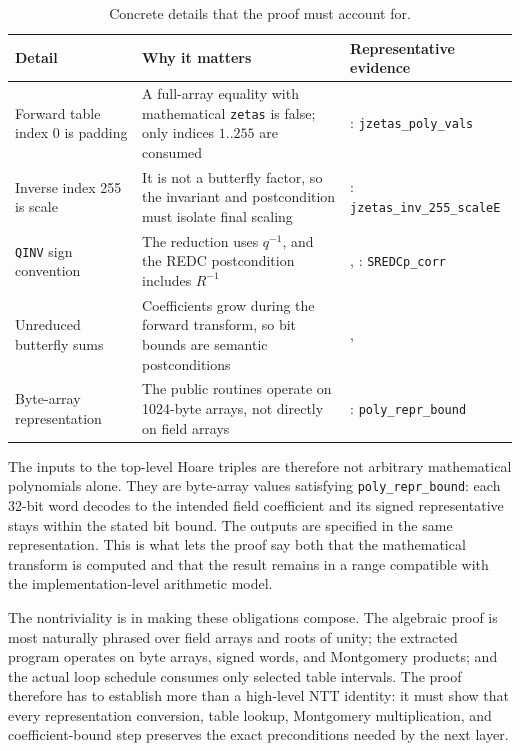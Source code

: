 \documentclass[10pt,twocolumn]{article}
\begin{document}
\begin{table}[t]
\centering
\scriptsize
\setlength{\tabcolsep}{3pt}
\begin{tabular}{P{0.26\columnwidth}P{0.36\columnwidth}P{0.28\columnwidth}}
\toprule
Detail & Why it matters & Representative evidence \\
\midrule
Forward table index 0 is padding & A full-array equality with mathematical
\texttt{zetas} is false; only indices \(1..255\) are consumed
& : \texttt{jzetas\_poly\_vals} \\
Inverse index 255 is scale & It is not a butterfly factor, so the invariant and
postcondition must isolate final scaling
& : \texttt{jzetas\_inv}\newline\texttt{\_255\_scaleE} \\
\texttt{QINV} sign convention & The reduction uses \(q^{-1}\), and the REDC
postcondition includes \(R^{-1}\)
& , : \texttt{SREDCp\_corr} \\
Unreduced butterfly sums & Coefficients grow during the forward transform, so
bit bounds are semantic postconditions
& ,  \\
Byte-array representation & The public routines operate on 1024-byte arrays,
not directly on field arrays
& : \texttt{poly\_repr\_bound} \\
\bottomrule
\end{tabular}
\caption{Concrete details that the proof must account for.}
\label{tab:risks}
\end{table}

The inputs to the top-level Hoare triples are therefore not arbitrary
mathematical polynomials alone. They are byte-array values satisfying
\texttt{poly\_repr\_bound}: each 32-bit word decodes to the intended field
coefficient and its signed representative stays within the stated bit bound.
The outputs are specified in the same representation. This is what lets the
proof say both that the mathematical transform is computed and that the result
remains in a range compatible with the implementation-level arithmetic model.

The nontriviality is in making these obligations compose. The algebraic proof
is most naturally phrased over field arrays and roots of unity; the extracted
program operates on byte arrays, signed words, and Montgomery products; and the
actual loop schedule consumes only selected table intervals. The proof therefore
has to establish more than a high-level NTT identity: it must show that every
representation conversion, table lookup, Montgomery multiplication, and
coefficient-bound step preserves the exact preconditions needed by the next
layer.
\end{document}
